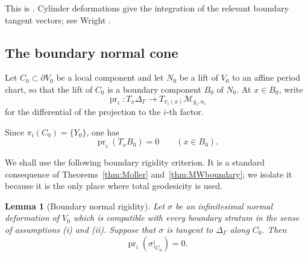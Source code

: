 \documentclass[11pt]{amsart}
\newtheorem{lemma}[theorem]{Lemma}
\theoremstyle{definition}
\theoremstyle{remark}
\newcommand{\M}{\mathcal M}
\begin{document}
This is \cite[Theorem~1.1 and the boundary-tangent-space construction in
\S\S2--4]{MW2017}. Cylinder deformations give the integration of the
relevant boundary tangent vectors; see Wright
\cite[Theorem~1.1]{Wright2015}.

\subsection{The boundary normal cone}

Let \(C_0\subset\partial V_0\) be a local component and let \(N_0\) be a
lift of \(V_0\) to an affine period chart, so that the lift of \(C_0\) is
a boundary component \(B_0\) of \(N_0\). At \(x\in B_0\), write
\[
\operatorname{pr}_i:
T_x\Delta_\Gamma\longrightarrow T_{\pi_i(x)}\M_{g_i,n_i}
\]
for the differential of the projection to the \(i\)-th factor.

Since \(\pi_i(C_0)=\{Y_0\}\), one has
\begin{equation}\label{eq:zero-boundary-projection}
\operatorname{pr}_i(T_xB_0)=0
\qquad (x\in B_0).
\end{equation}

We shall use the following boundary rigidity criterion. It is a standard
consequence of Theorems~\ref{thm:Moller} and~\ref{thm:MWboundary}; we
isolate it because it is the only place where total geodesicity is used.

\begin{lemma}[Boundary normal rigidity]
\label{lem:boundary-normal-rigidity}
Let \(\sigma\) be an infinitesimal normal deformation of \(V_0\) which is
compatible with every boundary stratum in the sense of assumptions
\textup{(i)} and \textup{(ii)}. Suppose that \(\sigma\) is tangent to
\(\Delta_\Gamma\) along \(C_0\). Then
\[
\operatorname{pr}_i(\sigma|_{C_0})=0.
\]
\end{lemma}
\end{document}

